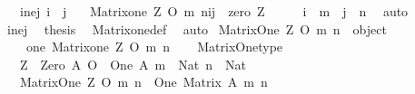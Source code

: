 \begin{isabellebody}
\ \ \ i{\isacharunderscore}{\kern0pt}ne{\isacharunderscore}{\kern0pt}j{\isacharcolon}{\kern0pt}\ {\isachardoublequoteopen}i\ {\isasymnoteq}\ j{\isachardoublequoteclose}\isanewline
\ \ \ {\isachardoublequoteopen}{\isacharparenleft}{\kern0pt}Matrix{\isacharunderscore}{\kern0pt}one\ Z\ O\ m\ n{\isacharparenright}{\kern0pt}{\isacharbackquote}{\kern0pt}i{\isacharbackquote}{\kern0pt}j\ {\isacharequal}{\kern0pt}\ zero\ Z{\isachardoublequoteclose}\isanewline
%
\isadelimproof
%
\endisadelimproof
%
\isatagproof
{}\isamarkupfalse%
\ {\isacharminus}{\kern0pt}\isanewline
\ \ \isamarkupfalse%
\ {\isachardoublequoteopen}i\ {\isasymin}\ {\isacharbrackleft}{\kern0pt}{}{\isacharcomma}{\kern0pt}{\isasymdots}{\isacharcomma}{\kern0pt}m{\isacharbrackleft}{\kern0pt}{\isachardoublequoteclose}\ \ {\isachardoublequoteopen}j\ {\isasymin}\ {\isacharbrackleft}{\kern0pt}{}{\isacharcomma}{\kern0pt}{\isasymdots}{\isacharcomma}{\kern0pt}n{\isacharbrackleft}{\kern0pt}{\isachardoublequoteclose}\ \isamarkupfalse%
\ auto\isanewline
\ \ \isamarkupfalse%
\ i{\isacharunderscore}{\kern0pt}ne{\isacharunderscore}{\kern0pt}j\ \isamarkupfalse%
\ {\isacharquery}{\kern0pt}thesis\ \isamarkupfalse%
\ Matrix{\isacharunderscore}{\kern0pt}one{\isacharunderscore}{\kern0pt}def\ \isamarkupfalse%
\ auto\isanewline
{}\isamarkupfalse%
%
\endisatagproof
{\isafoldproof}%
%
\isadelimproof
\isanewline
%
\endisadelimproof
\isanewline
{}\isamarkupfalse%
\ {\isachardoublequoteopen}Matrix{\isacharunderscore}{\kern0pt}One\ Z\ O\ m\ n\ {\isasymequiv}\ object\ {\isacharbraceleft}{\kern0pt}\isanewline
\ \ \ \ {\isasymlangle}{\isacharat}{\kern0pt}one{\isacharcomma}{\kern0pt}\ Matrix{\isacharunderscore}{\kern0pt}one\ Z\ O\ m\ n{\isasymrangle}\isanewline
\ \ {\isacharbraceright}{\kern0pt}{\isachardoublequoteclose}\isanewline
\isanewline
{}\isamarkupfalse%
\ Matrix{\isacharunderscore}{\kern0pt}One{\isacharunderscore}{\kern0pt}type{\isacharcolon}{\kern0pt}\isanewline
\ \ \ {\isachardoublequoteopen}Z\ {\isacharcolon}{\kern0pt}\ Zero\ A{\isachardoublequoteclose}\ {\isachardoublequoteopen}O\ {\isacharcolon}{\kern0pt}\ One\ A{\isachardoublequoteclose}\ {\isachardoublequoteopen}m\ {\isacharcolon}{\kern0pt}\ Nat{\isachardoublequoteclose}\ {\isachardoublequoteopen}n\ {\isacharcolon}{\kern0pt}\ Nat{\isachardoublequoteclose}\isanewline
\ \ \ {\isachardoublequoteopen}Matrix{\isacharunderscore}{\kern0pt}One\ Z\ O\ m\ n\ {\isacharcolon}{\kern0pt}\ One\ {\isacharparenleft}{\kern0pt}Matrix\ A\ m\ n{\isacharparenright}{\kern0pt}{\isachardoublequoteclose}\isanewline

\end{isabellebody}
